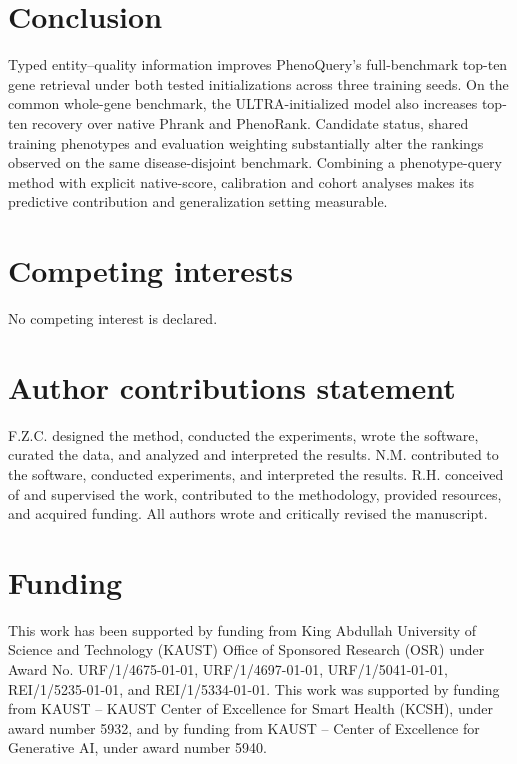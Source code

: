 \documentclass[webpdf,contemporary,large]{oup-authoring-template}%
\theoremstyle{thmstyleone}%
\theoremstyle{thmstyletwo}%
\theoremstyle{thmstylethree}%
\begin{document}
\section{Conclusion}

Typed entity--quality information improves PhenoQuery's full-benchmark top-ten
gene retrieval under both tested initializations across three training seeds.
On the common whole-gene benchmark, the ULTRA-initialized model also increases
top-ten recovery over native Phrank and PhenoRank. Candidate status, shared training
phenotypes and evaluation weighting substantially alter the rankings observed
on the same disease-disjoint benchmark. Combining a phenotype-query method
with explicit native-score, calibration and cohort analyses makes its predictive
contribution and generalization setting measurable.

\section*{Competing interests}
No competing interest is declared.

\section*{Author contributions statement}

F.Z.C. designed the method, conducted the experiments, wrote the software,
curated the data, and analyzed and interpreted the results. N.M.
contributed to the software, conducted experiments, and interpreted the
results. R.H. conceived of and supervised the work, contributed to the
methodology, provided resources, and acquired funding. All authors wrote
and critically revised the manuscript.

\section*{Funding}
This work has been supported by funding from King Abdullah University
of Science and Technology (KAUST) Office of Sponsored Research (OSR)
under Award No. URF/1/4675-01-01, URF/1/4697-01-01, URF/1/5041-01-01,
REI/1/5235-01-01, and REI/1/5334-01-01. This work was supported by
funding from KAUST -- KAUST Center of Excellence for Smart Health
(KCSH), under award number 5932, and by funding from KAUST -- Center of
Excellence for Generative AI, under award number 5940.
\end{document}
